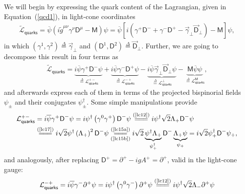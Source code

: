 \begin{note}\noindent
We will begin by expressing the quark content of the Lagrangian, given in Equation~(\cref{qcd1}), in light-cone coordinates
\begin{align*}
\widetilde{\mathcal{L}}_{\textsf{quarks}}=\overline{\psi}\left(i\widetilde{g}^{\mu\nu}\gamma^\nu\textsf{D}^\mu-\textsf{M}\right)\psi=\overline{\psi}\left[i\left(\gamma^+\textsf{D}^-+\gamma^-\textsf{D}^+-\vec{\gamma}_\perp\vec{\textsf{D}}_\perp\right)-\textsf{M}\right]\psi,
\end{align*}
in which $(\gamma^1,\gamma^2)\overset{\Delta}{=}\vec{\gamma}_\perp$ and $(\textsf{D}^1,\textsf{D}^2)\overset{\Delta}{=}\vec{\textsf{D}}_\perp$. Further, we are going to decompose this result in four terms as
\begin{align*}
\widetilde{\mathcal{L}}_{\textsf{quarks}}=\underbrace{i\overline{\psi}\gamma^+\textsf{D}^-\psi}_{\overset{\Delta}{=}\mathcal{L}_{\textsf{quarks}}^{+-}}+\underbrace{i\overline{\psi}\gamma^-\textsf{D}^+\psi}_{\overset{\Delta}{=}\mathcal{L}_{\textsf{quarks}}^{-+}}-\underbrace{i\overline{\psi}\vec{\gamma}_\perp\vec{\textsf{D}}_\perp\psi}_{\overset{\Delta}{=}\mathcal{L}_{\textsf{quarks}}^{\perp}}-\underbrace{\textsf{M}\overline{\psi}\psi}_{\overset{\Delta}{=}\mathcal{L}_{\textsf{quarks}}^\textsf{M}},
\end{align*}
and afterwards express each of them in terms of the projected bispinorial fields $\psi_\pm$ and their conjugates $\psi_\pm^\dag$. Some simple manipulations provide
\begin{align*}
\mathcal{L}_{\textsf{quarks}}^{+-}&=i\overline{\psi}\gamma^+\textsf{D}^-\psi=i\psi^\dag\left(\gamma^0\gamma^+\right)\textsf{D}^-\psi\stackrel{(\text{\cref{lc12}})}{=\joinrel=\joinrel=}i\psi^\dag\sqrt{2}\Lambda_+\textsf{D}^-\psi\\
&\stackrel{(\text{\cref{lc17}})}{=\joinrel=\joinrel=}i\sqrt{2}\psi^\dag\left(\Lambda_+\right)^2\textsf{D}^-\psi\underset{(\text{\cref{lc15b}})}{\stackrel{(\text{\cref{lc15a}})}{=\joinrel=\joinrel=}}i\sqrt{2}\underbrace{\psi^\dag\Lambda_+}_{\psi_+^\dag}\textsf{D}^-\underbrace{\Lambda_+\psi}_{\psi_+}=i\sqrt{2}\psi_+^\dag\textsf{D}^-\psi_+,
\end{align*} 
and analogously, after replacing $\textsf{D}^+=\partial^+-igA^+=\partial^+$, valid in the light-cone gauge:
\begin{align*}
\mathcal{L}_{\textsf{quarks}}^{-+}&=i\overline{\psi}\gamma^-\partial^+\psi=i\psi^\dag\left(\gamma^0\gamma^-\right)\partial^+\psi\stackrel{(\text{\cref{lc12}})}{=\joinrel=\joinrel=}i\psi^\dag\sqrt{2}\Lambda_-\partial^+\psi\\

\end{align*}
\end{note}
